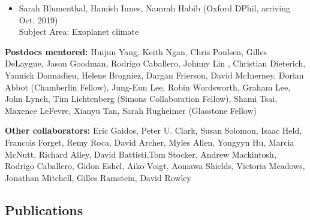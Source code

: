 \documentclass[11pt]{article}
\begin{document}
\begin{bibsection}
\begin{itemize}
	 \item{Sarah Blumenthal, Hamish Innes, Namrah Habib} (Oxford DPhil, arriving Oct. 2019) \\
            Subject Area: Exoplanet climate
         \end{itemize}
    \item \textbf{Postdocs mentored:} {Huijun Yang}, { Keith Ngan}, {Chris Poulsen}, {Gilles DeLaygue}, {Jason Goodman},{  Rodrigo Caballero}, {Johnny Lin}
  , {Christian Dieterich}, {Yannick Donnadieu}, {Helene Brogniez}, {Dargan Frierson}, {David McInerney},
  {Dorian Abbot} (Chamberlin Fellow), {Jung-Eun Lee}, {Robin Wordsworth}, {Graham Lee}, {John Lynch}, {Tim Lichtenberg} (Simons Collaboration Fellow), {Shami Tsai}, {Maxence LeFevre}, {Xianyu Tan}, {Sarah Rugheimer} (Glasstone Fellow)
    \item \textbf{Other collaborators:} Eric Gaidos, Peter U. Clark, Susan Solomon, Isaac Held, Francois Forget, Remy Roca, David Archer, Myles Allen, Yongyyn Hu, Marcia McNutt, Richard Alley, David Battisti,Tom Stocker,
   Andrew Mackintosh, Rodrigo Caballero, Gidon Eshel, Aiko Voigt, Aomawa Shields, Victoria Meadows, 
   Jonathan Mitchell, Gilles Ramstein, David Rowley



\end{bibsection}

\subsection{Publications}
\end{document}
